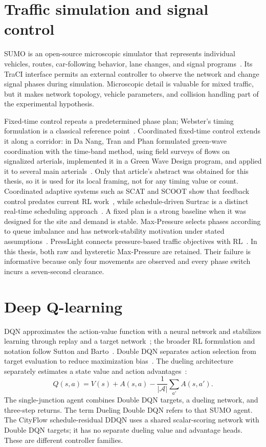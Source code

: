\documentclass[12pt,a4paper]{report}
\newcommand{\ddqn}{Dueling Double DQN}
\begin{document}
\section{Traffic simulation and signal control}
SUMO is an open-source microscopic simulator that represents individual vehicles, routes, car-following behavior, lane changes, and signal programs~\cite{lopez2018sumo,krajzewicz2010sumo}. Its TraCI interface permits an external controller to observe the network and change signal phases during simulation. Microscopic detail is valuable for mixed traffic, but it makes network topology, vehicle parameters, and collision handling part of the experimental hypothesis.

Fixed-time control repeats a predetermined phase plan; Webster's timing formulation is a classical reference point~\cite{webster1958signals}. Coordinated fixed-time control extends it along a corridor: in Da Nang, Tran and Phan formulated green-wave coordination with the time-band method, using field surveys of flows on signalized arterials, implemented it in a Green Wave Design program, and applied it to several main arterials~\cite{tran2007greenwave}. Only that article's abstract was obtained for this thesis, so it is used for its local framing, not for any timing value or count. Coordinated adaptive systems such as SCAT and SCOOT show that feedback control predates current RL work~\cite{sims1980scat,robertson1991scoot}, while schedule-driven Surtrac is a distinct real-time scheduling approach~\cite{smith2013surtrac}. A fixed plan is a strong baseline when it was designed for the site and demand is stable. Max-Pressure selects phases according to queue imbalance and has network-stability motivation under stated assumptions~\cite{varaiya2013maxpressure,pumir2015modifiedpressure}. PressLight connects pressure-based traffic objectives with RL~\cite{wei2019presslight}. In this thesis, both raw and hysteretic Max-Pressure are retained. Their failure is informative because only four movements are observed and every phase switch incurs a seven-second clearance.

\section{Deep Q-learning}
DQN approximates the action-value function with a neural network and stabilizes learning through replay and a target network~\cite{mnih2015dqn}; the broader RL formulation and notation follow Sutton and Barto~\cite{sutton2018rl}. Double DQN separates action selection from target evaluation to reduce maximization bias~\cite{hasselt2016double}. The dueling architecture separately estimates a state value and action advantages~\cite{wang2016dueling}:
\begin{equation}
Q(s,a)=V(s)+A(s,a)-\frac{1}{|\mathcal{A}|}\sum_{a'}A(s,a').
\end{equation}
The single-junction agent combines Double DQN targets, a dueling network, and three-step returns. The term \ddqn{} refers to that SUMO agent. The CityFlow schedule-residual DDQN uses a shared scalar-scoring network with Double DQN targets; it has no separate dueling value and advantage heads. These are different controller families.
\end{document}
